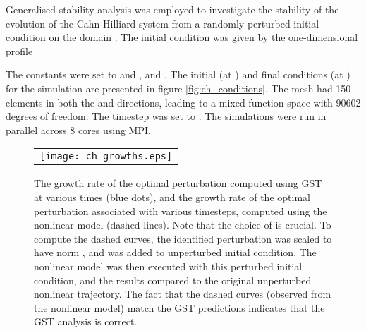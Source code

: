 \documentclass{siamltex}
\begin{document}
Generalised stability analysis was employed to investigate the stability of the evolution of the Cahn-Hilliard system from a
randomly perturbed initial condition on the domain . The initial condition was given by the one-dimensional profile

The constants were set to  and , and . The initial (at ) and final
conditions (at ) for the simulation are presented in figure \ref{fig:ch_conditions}. The mesh had 150 elements in both
the  and  directions, leading to a mixed function space with 90602 degrees of freedom. The timestep  was set to
. The simulations were run in parallel across 8 cores using MPI.

\begin{figure}
  \centering
  \begin{tabular}{c}
    \texttt{[image: ch\_growths.eps]}
  \end{tabular}
  \caption{The growth rate of the optimal perturbation computed using GST at various times (blue
  dots), and the growth rate of the optimal perturbation associated with various timesteps, computed
using the nonlinear model (dashed lines). Note that the choice of  is crucial. To compute the dashed curves, the identified perturbation
was scaled to have norm , and was added to unperturbed initial 
condition. The nonlinear model was then executed with this perturbed initial condition, and the
results compared to the original unperturbed nonlinear trajectory. The fact that the dashed curves
(observed from the nonlinear model) match the GST predictions indicates that the GST analysis is
correct.}
  \label{fig:ch_growths}
\end{figure}
\end{document}
